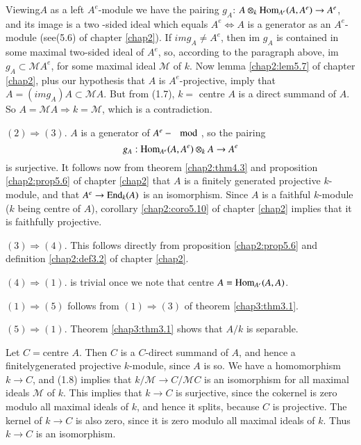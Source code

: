   Viewing\pageoriginale $A$ as a left $A^e$-module we have the pairing
  $g_A$: $A 
  \otimes_k \Hom_{A^e}\break (A, A^e) \to A^e$, and its image is a two
  -sided ideal which equals $A^e \Leftrightarrow A$ is a generator as
  an $A^e$-module (see(5.6) of chapter \ref{chap2}). If $im g_A \neq A^e$, then
  im $g_A$ is contained in some maximal two-sided ideal of $A^e$, so,
  according to the paragraph above, im $g_A \subset \mathscr{M}
  A^e$, for some maximal ideal $\mathscr{M}$ of $k$. Now lemma
  \ref{chap2:lem5.7} of 
  chapter \ref{chap2}, plus our hypothesis that $A$ is $A^e$-projective, imply
  that $A=(im g_A)A \subset \mathscr{M}A$. But from (1.7), $k=$ centre
  $A$ is a direct summand of $A$. So $A = \mathscr{M} A \Rightarrow k
  = \mathscr{M}$, which is a contradiction. 
  
  $(2) \Rightarrow (3)$. $A$ is a generator of $A^e-\mod$, so the pairing
  $$
  g_{A}: \operatorname{Hom}_{A^e}(A, A^e) \otimes_k A \to  A^e
  $$ 
  is surjective. It follows now from theorem \ref{chap2:thm4.3} and
  proposition \ref{chap2:prop5.6} 
  of chapter \ref{chap2} that $A$ is a finitely generated projective
  $k$-module, and that $A^e \to \operatorname{End}_k (A)$ is an isomorphism. Since
  $A$ is a faithful $k$-module ($k$ being centre of $A$), corollary
   \ref{chap2:coro5.10} of chapter \ref{chap2} implies that it is
   faithfully projective.  
  
  $(3) \Rightarrow (4)$. This follows directly from proposition
  \ref{chap2:prop5.6}  and definition \ref{chap2:def3.2} of chapter
  \ref{chap2}.  
  
  $(4) \Rightarrow (1)$. is trivial once we note that centre $A=
  \operatorname{Hom}_{A^e} (A,A)$. 
  
  $(1) \Rightarrow (5)$ follows from $(1) \Rightarrow (3)$ of theorem
  \ref{chap3:thm3.1}. 
  
  $(5) \Rightarrow (1)$. Theorem  \ref{chap3:thm3.1} shows that $A/k$
  is separable. 
  
  Let $C=$centre $A$. Then $C$ is a $C$-direct summand of $A$, and
  hence a finitely\pageoriginale generated projective $k$-module, since $A$ is
  so. We have a homomorphism $k \to C$, and (1.8) implies that $k/
  \mathscr{M} \to C / \mathscr{M}C$ is an isomorphism for all maximal
  ideals $\mathscr{M}$ of $k$. This implies that $k \to C$ is
  surjective, since the cokernel is zero modulo all maximal ideals of
  $k$, and hence it splits, because $C$ is projective. The kernel of
  $k \to C$ is also zero, since it is zero modulo all maximal ideals
  of $k$. Thus $k \to C$ is an isomorphism. 
  
